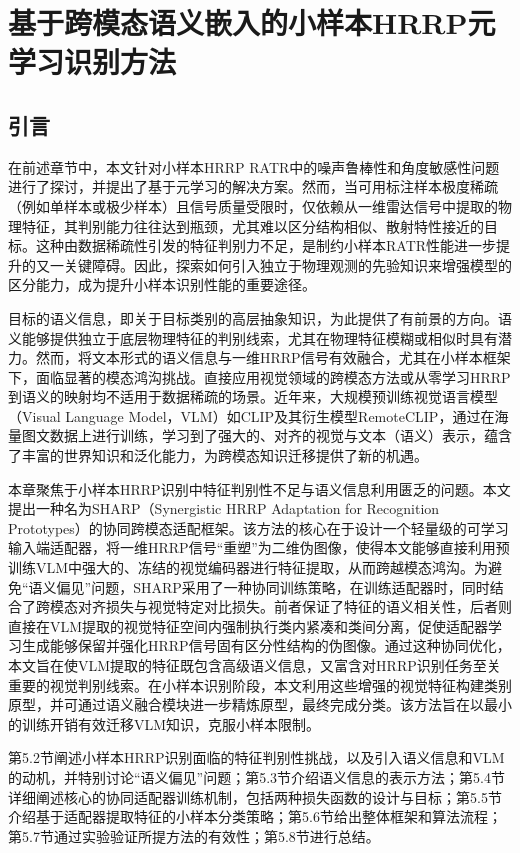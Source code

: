 \chapter[基于跨模态语义嵌入的小样本HRRP元学习识别方法]{基于跨模态语义嵌入的小样本HRRP元学习识别方法}
\label{chap:semantic_fusion}

\section{引言}
\label{sec:semantic_intro}

在前述章节中，本文针对小样本HRRP RATR中的噪声鲁棒性和角度敏感性问题进行了探讨，并提出了基于元学习的解决方案。然而，当可用标注样本极度稀疏（例如单样本或极少样本）且信号质量受限时，仅依赖从一维雷达信号中提取的物理特征，其判别能力往往达到瓶颈，尤其难以区分结构相似、散射特性接近的目标。这种由数据稀疏性引发的特征判别力不足，是制约小样本RATR性能进一步提升的又一关键障碍。因此，探索如何引入独立于物理观测的先验知识来增强模型的区分能力，成为提升小样本识别性能的重要途径。

目标的语义信息，即关于目标类别的高层抽象知识，为此提供了有前景的方向。语义能够提供独立于底层物理特征的判别线索，尤其在物理特征模糊或相似时具有潜力。然而，将文本形式的语义信息与一维HRRP信号有效融合，尤其在小样本框架下，面临显著的模态鸿沟挑战。直接应用视觉领域的跨模态方法或从零学习HRRP到语义的映射均不适用于数据稀疏的场景。近年来，大规模预训练视觉语言模型（Visual Language Model，VLM）如CLIP及其衍生模型RemoteCLIP，通过在海量图文数据上进行训练，学习到了强大的、对齐的视觉与文本（语义）表示，蕴含了丰富的世界知识和泛化能力，为跨模态知识迁移提供了新的机遇。

本章聚焦于小样本HRRP识别中特征判别性不足与语义信息利用匮乏的问题。本文提出一种名为SHARP（Synergistic HRRP Adaptation for Recognition Prototypes）的协同跨模态适配框架。该方法的核心在于设计一个轻量级的可学习输入端适配器，将一维HRRP信号“重塑”为二维伪图像，使得本文能够直接利用预训练VLM中强大的、冻结的视觉编码器进行特征提取，从而跨越模态鸿沟。为避免“语义偏见”问题，SHARP采用了一种协同训练策略，在训练适配器时，同时结合了跨模态对齐损失与视觉特定对比损失。前者保证了特征的语义相关性，后者则直接在VLM提取的视觉特征空间内强制执行类内紧凑和类间分离，促使适配器学习生成能够保留并强化HRRP信号固有区分性结构的伪图像。通过这种协同优化，本文旨在使VLM提取的特征既包含高级语义信息，又富含对HRRP识别任务至关重要的视觉判别线索。在小样本识别阶段，本文利用这些增强的视觉特征构建类别原型，并可通过语义融合模块进一步精炼原型，最终完成分类。该方法旨在以最小的训练开销有效迁移VLM知识，克服小样本限制。

第5.2节阐述小样本HRRP识别面临的特征判别性挑战，以及引入语义信息和VLM的动机，并特别讨论“语义偏见”问题；第5.3节介绍语义信息的表示方法；第5.4节详细阐述核心的协同适配器训练机制，包括两种损失函数的设计与目标；第5.5节介绍基于适配器提取特征的小样本分类策略；第5.6节给出整体框架和算法流程；第5.7节通过实验验证所提方法的有效性；第5.8节进行总结。

